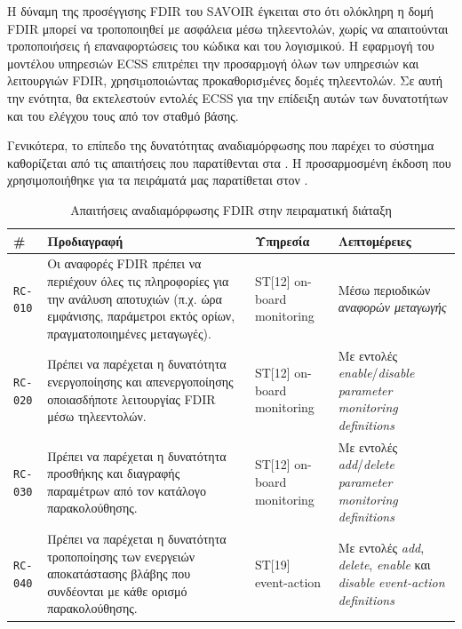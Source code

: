 \documentclass[a4paper,nobib]{tufte-book}
\begin{document}
Η δύναμη της προσέγγισης \ac{FDIR} του \acs{SAVOIR} έγκειται στο ότι ολόκληρη η δομή \ac{FDIR} μπορεί να τροποποιηθεί με ασφάλεια μέσω τηλεεντολών, χωρίς να απαιτούνται τροποποιήσεις ή επαναφορτώσεις του κώδικα και του λογισμικού. Η εφαρµογή του μοντέλου υπηρεσιών \acs{ECSS} επιτρέπει την προσαρµογή όλων των υπηρεσιών και λειτουργιών \ac{FDIR}, χρησιµοποιώντας προκαθορισµένες δοµές τηλεεντολών. Σε αυτή την ενότητα, θα εκτελεστούν εντολές \acs{ECSS} για την επίδειξη αυτών των δυνατοτήτων και του ελέγχου τους από τον σταθμό βάσης.

Γενικότερα, το επίπεδο της δυνατότητας αναδιαμόρφωσης που παρέχει το σύστημα καθορίζεται από τις απαιτήσεις που παρατίθενται στα \cite{ECSS-E-ST-70-11C,SAVOIR-HB-003}. Η προσαρμοσμένη έκδοση που χρησιμοποιήθηκε για τα πειράματά μας παρατίθεται στον .

\begin{table}[h]
	\centering
	\caption[]{Απαιτήσεις αναδιαμόρφωσης \acs{FDIR} στην πειραματική διάταξη}
	\label{tab:fdir-recon-rq}
	\begin{tabularx}{\textwidth}{@{}lXlL{4cm}@{}}
		\toprule
		\# & Προδιαγραφή & Υπηρεσία & Λεπτομέρειες \\ \midrule
		\texttt{RC-010} & Οι αναφορές FDIR πρέπει να περιέχουν όλες τις πληροφορίες για την ανάλυση αποτυχιών (π.χ. ώρα εμφάνισης, παράμετροι εκτός ορίων, πραγματοποιημένες μεταγωγές). & ST[12] on-board monitoring & Μέσω περιοδικών \emph{αναφορών μεταγωγής} \\
		\texttt{RC-020} & Πρέπει να παρέχεται η δυνατότητα ενεργοποίησης και απενεργοποίησης οποιασδήποτε λειτουργίας FDIR μέσω τηλεεντολών. & ST[12] on-board monitoring & Με εντολές \emph{enable}/\emph{disable} \emph{parameter monitoring definitions} \\
		\texttt{RC-030} & Πρέπει να παρέχεται η δυνατότητα προσθήκης και διαγραφής παραμέτρων από τον κατάλογο παρακολούθησης. & ST[12] on-board monitoring & Με εντολές \emph{add}/\emph{delete} \emph{parameter monitoring definitions} \\
		\texttt{RC-040} & Πρέπει να παρέχεται η δυνατότητα τροποποίησης των ενεργειών αποκατάστασης βλάβης που συνδέονται με κάθε ορισμό παρακολούθησης. & ST[19] event-action & Με εντολές \emph{add}, \emph{delete}, \emph{enable} και \emph{disable} \emph{event-action definitions} \\ \bottomrule
	\end{tabularx}
	\vspace{5pt}
\end{table}
\end{document}
